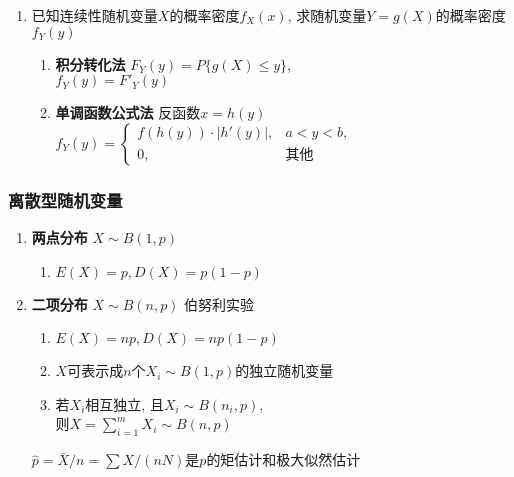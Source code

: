 \documentclass[10pt,a4paper,nofonts]{ctexart}
\renewcommand{\le}{\leqslant}
\begin{document}
\begin{multicols}{2}
\begin{enumerate}
\item 已知连续性随机变量$X$的概率密度$f_X(x)$, 求随机变量$Y=g(X)$的概率密度$f_Y(y)$
\begin{enumerate}
\item {\bf 积分转化法} $F_Y(y)=P\{g(X)\le y\}$,\\$f_Y(y)=F'_Y(y)$
\item {\bf 单调函数公式法} 反函数$x=h(y)$ \\
$f_Y(y)=\left\{\begin{array}{cl}
f(h(y))\cdot|h'(y)|, & a< y< b,\\
0, & \text{其他}
\end{array}\right.$
\end{enumerate}

\end{enumerate}

\subsubsection*{离散型随机变量}

\begin{enumerate}
\item {\bf 两点分布} $X\sim B(1,p)$\\
\begin{enumerate}[label={\sf 性质\arabic*}]
\item $E(X)=p, D(X)=p(1-p)$
\end{enumerate}

\item {\bf 二项分布} $X\sim B(n,p)$ 伯努利实验\\
\begin{enumerate}[label={\sf 性质\arabic*}]
\item $E(X)=np, D(X)=np(1-p)$
\item $X$可表示成$n$个$X_i\sim B(1,p)$的独立随机变量
\item 若$X_i$相互独立, 且$X_i\sim B(n_i,p)$, \\则$X=\sum_{i=1}^{m}X_i\sim B(n,p)$
\end{enumerate}
$\hat{p}={\bar{X}}/{n}={\sum{X}}/{(nN)}$是$p$的矩估计和极大似然估计


\end{enumerate}
\end{multicols}
\end{document}
